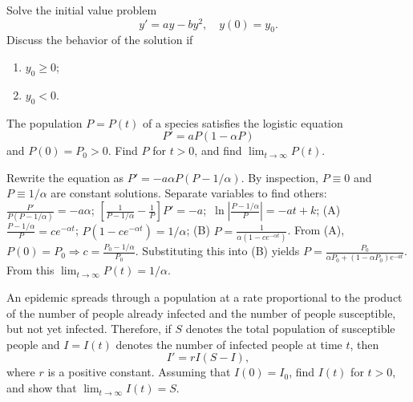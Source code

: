 \documentclass{ximera}
\begin{document}
\begin{problem}\label{exer:2.2.27}
Solve the initial value problem
$$
y'=ay-by^2,\quad y(0)=y_0.
$$
Discuss the behavior  of the solution if
\begin{enumerate}
    \item $y_0\geq 0$;
    \item $y_0<0$.
\end{enumerate}
\end{problem}

\begin{problem}\label{exer:2.2.28}
 The population $P=P(t)$ of a  species satisfies
the logistic equation
$$
P'=aP(1-\alpha P)
$$
 and  $P(0)=P_0>0$.  Find $P$  for $t>0$, and  find
$\lim_{t\to\infty}P(t)$.

 

\begin{solution}
    Rewrite the equation as $P'=-a\alpha P(P-1/\alpha)$.
By inspection, $P\equiv0$ and $P\equiv1/\alpha$ are constant
solutions.
Separate variables to find others: $\frac{P'}{
P(P-1/\alpha)}=-a\alpha$;\;
 $\left[\frac{1}{ P-1/\alpha}-\frac{1}{ P}\right]P'=-a
$;\ $\ln\left|\frac{P-1/\alpha}{ P}\right|=-at+k$;\;
(A) $\frac{P-1/\alpha}{
P}=ce^{-\alpha t}$; $P(1-ce^{-\alpha t})=1/\alpha$;\;
(B) $P=\frac{1}{\alpha(1-ce^{-\alpha t})}$. From (A),
 $P(0)=P_0\Rightarrow c=\frac{P_0-1/\alpha}{ P_0}$.
Substituting this into (B) yields
$P=\frac{P_0}{\alpha
P_0+(1-\alpha P_0)e^{-at}}$. From this
$\lim_{t\to\infty}P(t)=1/\alpha$.
\end{solution}
\end{problem}

\begin{problem}\label{exer:2.2.29}
An epidemic spreads through a population at a rate
proportional to the product of the number of people already infected and the number of people susceptible, but not yet infected. Therefore, if $S$ denotes the total population of susceptible people and $I=I(t)$ denotes the number of infected people at time $t$, then
$$
I'=rI(S-I),
$$
where $r$ is a positive constant. Assuming that $I(0)=I_0$,
find $I(t)$ for $t>0$, and show that
$\lim_{t\to\infty}I(t)=S$.
\end{problem}
\end{document}
